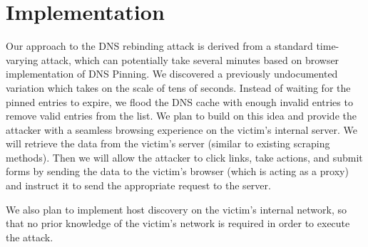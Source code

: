 \section{Implementation}
\label{sec:impl}

Our approach to the DNS rebinding attack is derived from a standard time-varying attack, which can potentially take several minutes based on browser implementation of DNS Pinning. We discovered a previously undocumented variation which takes on the scale of tens of seconds. Instead of waiting for the pinned entries to expire, we flood the DNS cache with enough invalid entries to remove valid entries from the list. We plan to build on this idea and provide the attacker with a seamless browsing experience on the victim's internal server. We will retrieve the data from the victim's server (similar to existing scraping methods). Then we will allow the attacker to click links, take actions, and submit forms by sending the data to the victim's browser (which is acting as a proxy) and instruct it to send the appropriate request to the server.

We also plan to implement host discovery on the victim's internal network, so that no prior knowledge of the victim's network is required in order to execute the attack.



